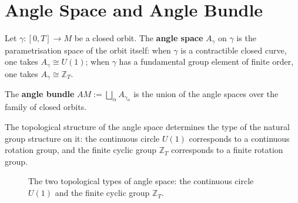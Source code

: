 \section{Angle Space and Angle Bundle}

\begin{definition}\label{def:angle_space}
Let $\gamma: [0, T] \to M$ be a closed orbit. The \textbf{angle space} $A_\gamma$ on $\gamma$ is the parametrisation space of the orbit itself: when $\gamma$ is a contractible closed curve, one takes $A_\gamma \cong U(1)$; when $\gamma$ has a fundamental group element of finite order, one takes $A_\gamma \cong \mathbb{Z}_T$.
\end{definition}

\begin{definition}\label{def:angle_bundle}
The \textbf{angle bundle} $AM := \bigsqcup_{\alpha} A_{\gamma_\alpha}$ is the union of the angle spaces over the family of closed orbits.
\end{definition}

\begin{proposition}\label{prop:angle_space_topology}
The topological structure of the angle space determines the type of the natural group structure on it: the continuous circle $U(1)$ corresponds to a continuous rotation group, and the finite cyclic group $\mathbb{Z}_T$ corresponds to a finite rotation group.
\end{proposition}

\begin{figure}[htbp]
\centering
{}
\caption{The two topological types of angle space: the continuous circle $U(1)$ and the finite cyclic group $\mathbb{Z}_T$.}
\label{fig:angle_space}
\end{figure}

